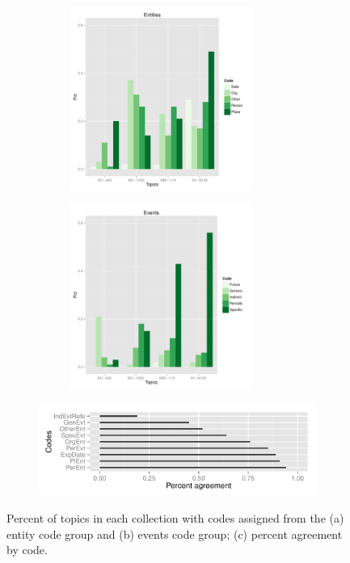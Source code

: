 \documentclass{asist}
\begin{document}
\begin{figure}[!ht]
\centering
\begin{subfigure}{.5\textwidth}
  \centering
\includegraphics[width=8cm, height=6cm]{plots/topic-groups-ent.pdf}
\end{subfigure}%
\begin{subfigure}{.5\textwidth}
  \centering
\includegraphics[width=8cm, height=6cm]{plots/topic-groups-evt.pdf}
\end{subfigure}
\begin{subfigure}{\textwidth}
\includegraphics[width=17cm]{plots/coder-agreement.pdf}
\end{subfigure}
\caption{Percent of topics in each collection with codes assigned from the (a) entity code group and (b) events code group; (c) percent agreement by code.}
\label{fig.codedist}
\end{figure}
\end{document}
